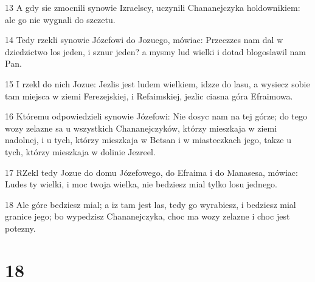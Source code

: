 \par 13 A gdy sie zmocnili synowie Izraelscy, uczynili Chananejczyka holdownikiem: ale go nie wygnali do szczetu.
\par 14 Tedy rzekli synowie Józefowi do Jozuego, mówiac: Przeczzes nam dal w dziedzictwo los jeden, i sznur jeden? a mysmy lud wielki i dotad blogoslawil nam Pan.
\par 15 I rzekl do nich Jozue: Jezlis jest ludem wielkiem, idzze do lasu, a wysiecz sobie tam miejsca w ziemi Ferezejskiej, i Refaimskiej, jezlic ciasna góra Efraimowa.
\par 16 Któremu odpowiedzieli synowie Józefowi: Nie dosyc nam na tej górze; do tego wozy zelazne sa u wszystkich Chananejczyków, którzy mieszkaja w ziemi nadolnej, i u tych, którzy mieszkaja w Betsan i w miasteczkach jego, takze u tych, którzy mieszkaja w dolinie Jezreel.
\par 17 RZekl tedy Jozue do domu Józefowego, do Efraima i do Manasesa, mówiac: Ludes ty wielki, i moc twoja wielka, nie bedziesz mial tylko losu jednego.
\par 18 Ale góre bedziesz mial; a iz tam jest las, tedy go wyrabiesz, i bedziesz mial granice jego; bo wypedzisz Chananejczyka, choc ma wozy zelazne i choc jest potezny.

\chapter{18}

